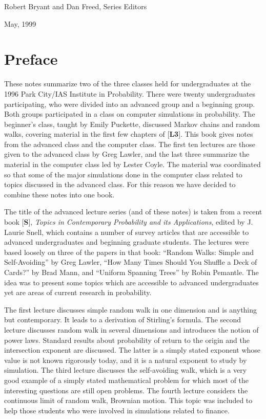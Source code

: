 \documentclass{stml-l}
\theoremstyle{definition}
\numberwithin{equation}{chapter}
\numberwithin{figure}{chapter}
\numberwithin{figure}{section}
\begin{document}
\hfill Robert Bryant and Dan Freed, Series Editors

\hfill May, 1999

\chapter*{Preface}

These notes summarize two of the three classes held for undergraduates at the 1996 Park City/IAS Institute in Probability. There were twenty undergraduates participating, who were divided into an advanced group and a beginning group. Both groups participated in a class on computer simulations in probability. The beginner's class, taught by Emily Puckette, discussed Markov chains and random walks, covering material in the first few chapters of  [\textbf{L3}]. This book gives notes from the advanced class and the computer class. The first ten lectures are those given to the advanced class by Greg Lawler, and the last three summarize the material in the computer class led by Lester Coyle. The material was coordinated so that some of the major simulations done in the computer class related to topics discussed in the advanced class. For this reason we have decided to combine these notes into one book.

The title of the advanced lecture series (and of these notes) is taken from a recent book [\textbf{S}], \emph{Topics in Contemporary Probability and its Applications}, edited by J. Laurie Snell, which contains a number of survey articles that are accessible to advanced undergraduates and beginning graduate students. The lectures were based loosely on three of the papers in that book: ``Random Walks: Simple and Self-Avoiding'' by Greg Lawler, ``How Many Times Should You Shuffle a Deck of Cards?'' by Brad Mann, and ``Uniform Spanning Trees'' by Robin Pemantle. The idea was to present some topics which are accessible to advanced undergraduates yet are areas of current research in probability.

The first lecture discusses simple random walk in one dimension and is anything but contemporary. It leads to a derivation of Stirling's formula. The second lecture discusses random walk in several dimensions and introduces the notion of power laws. Standard results about probability of return to the origin and the intersection exponent are discussed. The latter is a simply stated exponent whose value is not known rigorously today, and it is a natural exponent to study by simulation. The third lecture discusses the self-avoiding walk, which is a very good example of a simply stated mathematical problem for which most of the interesting questions are still open problems. The fourth lecture considers the continuous limit of random walk, Brownian motion. This topic was included to help those students who were involved in simulations related to finance.
\end{document}
